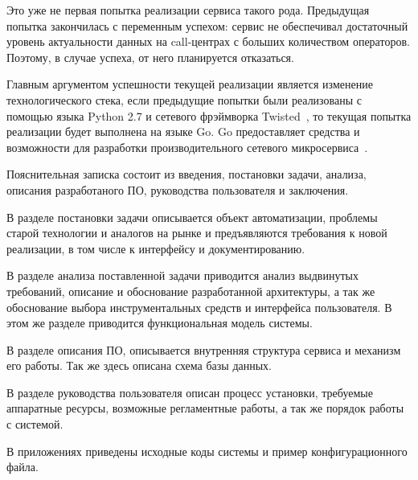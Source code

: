 Это уже не первая попытка реализации сервиса такого рода.
Предыдущая попытка закончилась с переменным успехом: сервис не обеспечивал достаточный уровень актуальности данных
на call-центрах с больших количеством операторов.
Поэтому, в случае успеха, от него планируется отказаться.

Главным аргументом успешности текущей реализации является изменение технологического стека,
если предыдущие попытки были реализованы с помощью языка Python 2.7 и сетевого фрэймворка Twisted~\cite{info:twisted}, %
то текущая попытка реализации будет выполнена на языке Go.
Go предоставляет средства и возможности для разработки производительного сетевого микросервиса~\cite{youtube:go}.

Пояснительная записка состоит из введения, постановки задачи, анализа, описания разработаного ПО, руководства пользователя и заключения.

В разделе постановки задачи описывается объект автоматизации, проблемы старой технологии и аналогов на рынке
и предъявляются требования к новой реализации, в том числе к интерфейсу и документированию.

В разделе анализа поставленной задачи приводится анализ выдвинутых требований,
описание и обоснование разработанной архитектуры,
а так же обоснование выбора инструментальных средств и интерфейса пользователя.
В этом же разделе приводится функциональная модель системы.

В разделе описания ПО, описывается внутренняя структура сервиса и механизм его работы.
Так же здесь описана схема базы данных.

В разделе руководства пользователя описан процесс установки, требуемые аппаратные ресурсы, возможные регламентные работы,
а так же порядок работы с системой.

В приложениях приведены исходные коды системы и пример конфигурационного файла.

